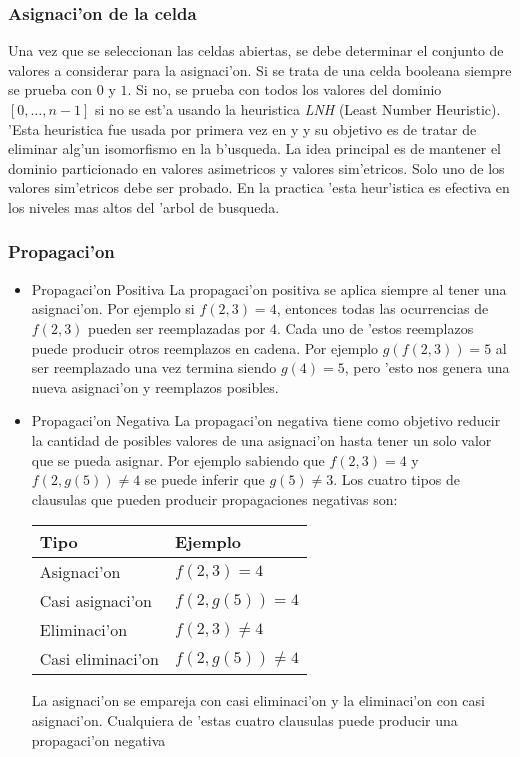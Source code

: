 \subsubsection{Asignaci'on de la celda}
Una vez que se seleccionan las celdas abiertas, se debe determinar el conjunto de valores a considerar para la asignaci'on. Si se trata de una celda booleana siempre se prueba con $0$ y $1$. Si no, se prueba con todos los valores del dominio $[0,\dots,n-1]$ si no se est'a usando la heuristica \textit{LNH} (Least Number Heuristic). 'Esta heuristica fue usada por primera vez en \cite{zhang95} y \cite{zhang96} y su objetivo es de tratar de eliminar alg'un isomorfismo en la b'usqueda. La idea principal es de mantener el dominio particionado en valores asimetricos y valores sim'etricos. Solo uno de los valores sim'etricos debe ser probado. En la practica 'esta heur'istica es efectiva en los niveles mas altos del 'arbol de busqueda.


\subsubsection{Propagaci'on}

\begin{itemize}

\item{Propagaci'on Positiva}
La propagaci'on positiva se aplica siempre al tener una asignaci'on. Por ejemplo si $f(2,3)=4$, entonces todas las ocurrencias de $f(2,3)$ pueden ser reemplazadas por $4$. Cada uno de 'estos reemplazos puede producir otros reemplazos en cadena. Por ejemplo $g(f(2,3))=5$ al ser reemplazado una vez termina siendo $g(4)=5$, pero 'esto nos genera una nueva asignaci'on y reemplazos posibles.

\item{Propagaci'on Negativa}
La propagaci'on negativa tiene como objetivo reducir la cantidad de posibles valores de una asignaci'on hasta tener un solo valor que se pueda asignar. Por ejemplo sabiendo que $f(2,3)=4$ y $f(2, g(5))\neq4$ se puede inferir que $g(5)\neq3$. Los cuatro tipos de clausulas que pueden producir propagaciones negativas son:

\begin{tabular}{ |l|l| }
Tipo & Ejemplo \\
\hline
Asignaci'on & $f(2,3)=4$ \\
Casi asignaci'on & $f(2,g(5))=4$ \\
Eliminaci'on & $f(2,3)\neq4$ \\
Casi eliminaci'on & $f(2,g(5))\neq4$ \\
\hline
\end{tabular}

La asignaci'on se empareja con casi eliminaci'on y la eliminaci'on con casi asignaci'on. Cualquiera de 'estas cuatro clausulas puede producir una propagaci'on negativa

\end{itemize}
